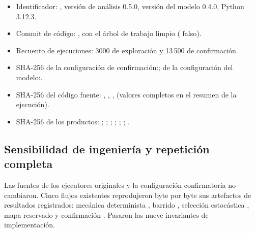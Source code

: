 \begin{itemize}
  \raggedright
  \item Identificador: \code{\RunID}, versión de análisis 0.5.0, versión del modelo 0.4.0, Python 3.12.3.
  \item Commit de código: , con el árbol de trabajo limpio ( falso).
  \item Recuento de ejecuciones: 3000 de exploración y 13\,500 de confirmación.
  \item SHA-256 de la configuración de confirmación:\newline{}; de la configuración del modelo:\newline{}.
  \item SHA-256 del código fuente:  ,  ,  ,   (valores completos en el resumen de la ejecución).
  \item SHA-256 de los productos:  ;  ;  ;  ;\newline{} ;\newline{} ;  .
\end{itemize}

\subsection*{Sensibilidad de ingeniería y repetición completa}

Las fuentes de los ejecutores originales y la configuración confirmatoria no cambiaron. Cinco flujos existentes reprodujeron byte por byte sus artefactos de resultados registrados: mecánica determinista , barrido , selección estocástica , mapa reservado  y confirmación . Pasaron las nueve invariantes de implementación.

